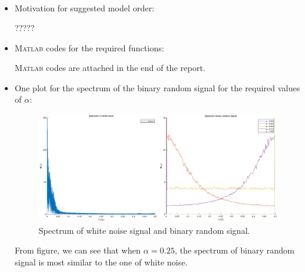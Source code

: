 \documentclass[10pt,a4paper]{article}
\begin{document}
\begin{itemize}
\begin{align*}
	\end{align*}
    \item Motivation for suggested model order:
    \par ?????
    \item \textsc{Matlab} codes for the required functions:
    \par \textsc{Matlab} codes are attached in the end of the report.
    \item One plot for the spectrum of the binary random signal for the required values of $\alpha$:
	\begin{figure}[ht]
		\footnotesize
		\centering 
		\includegraphics[width=\columnwidth]{chooseAlpha_0_25.eps} 
		\caption{Spectrum of white noise signal and binary random signal.}
		\label{fig:Spectrum}
	\end{figure}
	\par From figure, we can see that when $\alpha = 0.25$, the spectrum of binary random signal is most similar to the one of white noise.
\end{itemize}

\end{document}
